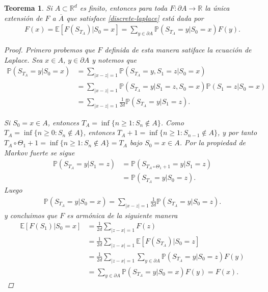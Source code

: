 \documentclass{article}
\newtheorem{teorema}[theorem]{Teorema}
\numberwithin{equation}{section}
\begin{document}
\begin{teorema}
    Si $A \subset \mathbb{R}^d$ es finito, entonces para toda $F : \partial A \to \mathbb{R}$ la única extensión de $F$ a $\overline{A}$ que satisface \eqref{discrete-laplace} está dada por
    \begin{align}\label{sol-laplace}
        F(x) = \mathbb{E}\left[F(S_{T_A}) | S_0 = x\right] = \sum_{y \in \partial A}\mathbb{P}(S_{T_A}=y | S_0 = x)F(y).
    \end{align}
    \begin{proof}
 
    Primero probemos que $F$ definida de esta manera satiface la ecuación de Laplace.
    Sea $x \in A$, $y \in \partial A$ y notemos que
    \begin{align*}
        \mathbb{P}(S_{T_A}=y | S_0 = x) &= \sum_{|x-z|=1}\mathbb{P}(S_{T_A}=y, S_1 = z | S_0 = x)\\
        &=  \sum_{|x-z|=1}\mathbb{P}(S_{T_A}=y | S_1 = z, S_0 = x)\mathbb{P}(S_1 = z | S_0 = x)    \\
        &= \sum_{|x-z|=1}\frac{1}{2d}\mathbb{P}(S_{T_A}=y | S_1 = z).
    \end{align*}
    
    Si $S_0 = x \in A$, entonces $T_A =\inf\{n\geq 1 : S_n \not \in A\}$. Como $T_A = \inf\{n\geq 0 : S_{n}\not \in A\}$, entonces $T_A+1 = \inf\{n\geq 1 : S_{n-1}\not \in A\} $, y por tanto $T_A\circ\Theta_1+1 = \inf\{n\geq 1 : S_{n}\not \in A\}= T_A$ bajo $S_0 = x \in A$. Por la propiedad de Markov fuerte se sigue
    \begin{align*}
         \mathbb{P}(S_{T_A}=y | S_1 = z) &= \mathbb{P}(S_{T_A\circ \Theta_1+1}=y | S_1 = z) \\
         &= \mathbb{P}(S_{T_A}=y | S_0 = z).
    \end{align*}
    Luego
    \begin{align*}
         \mathbb{P}(S_{T_A}=y | S_0 = x) = \sum_{|x-z|=1}\frac{1}{2d}\mathbb{P}(S_{T_A}=y | S_0 = z).
    \end{align*}
    y concluimos que $F$ es armónica de la siguiente manera
    \begin{align*}
         \mathbb{E}\left[F(S_1) | S_0 = x\right] &= \frac{1}{2d}\sum_{|z-x|=1}F(z)\\
         &= \frac{1}{2d}\sum_{|z-x|=1}\mathbb{E}\left[F(S_{T_A}) | S_0 = z\right]\\
         &= \frac{1}{2d}\sum_{|z-x|=1}\sum_{y \in \partial A}\mathbb{P}(S_{T_A}=y | S_0 = z)F(y)   \\
         &=\sum_{y \in \partial A}\mathbb{P}(S_{T_A}=y | S_0 = x)F(y) = F(x).
    \end{align*}
    

\end{proof}
\end{teorema}
\end{document}
